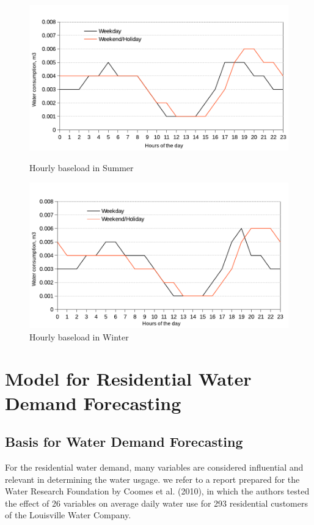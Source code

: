 \documentclass{sig-alternate}
\begin{document}
\begin{figure}[htp]
\centering
\begin{minipage}[b]{0.4\linewidth}
\includegraphics[width=1.0\textwidth]{images/hourlybaseloadsummer}
\vspace{-15pt}
\caption{Hourly baseload in Summer}
\label{fig:hourlybaseloadsummer}
\end{minipage}
\hspace{5pt}
\begin{minipage}[b]{0.4\linewidth}
\includegraphics[width=1.0\textwidth]{images/hourlybaseloadwinter}
\vspace{-15pt}
\caption{Hourly baseload in Winter}
\label{fig:hourlybaseloadwinter}
\end{minipage}
\end{figure}



\section{Model for Residential Water Demand Forecasting}
\subsection{Basis for Water Demand Forecasting}
For the residential water demand, many variables are considered influential and relevant in determining the water usgage. we refer to a report prepared for the Water Research Foundation by Coomes et al. (2010), in which the authors tested the effect of 26 variables on average daily water use for 293 residential customers of the Louisville Water Company.
\end{document}
